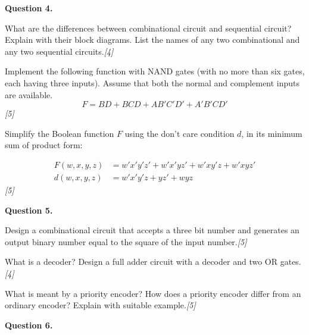 \documentclass[11pt,a4paper]{article}
\newcommand{\pts}[1]{\hfill   \textit{[#1]}}
\begin{document}



\noindent   \textbf{Question 4.}

\begin{parts}
  \item What are the differences between combinational circuit and sequential circuit? Explain with their block diagrams. List the names of any two combinational and any two sequential circuits.\pts{4}
  \item Implement the following function with NAND gates (with no more than six gates, each having three inputs). Assume that both the normal and complement inputs are available.
  \[ F = BD + BCD + AB'C'D' + A'B'CD' \]\pts{5}
  \item Simplify the Boolean function $F$ using the don't care condition $d$, in its minimum sum of product form:
  
\begin{align*}
    F(w, x, y, z) &= w'x'y'z' + w'x'yz' + w'xy'z + w'xyz' \\
    d(w, x, y, z) &= w'x'y'z + yz' + wyz
  \end{align*}\pts{5}
\end{parts}

\bigskip




\noindent   \textbf{Question 5.}

\begin{parts}
  \item Design a combinational circuit that accepts a three bit number and generates an output binary number equal to the square of the input number.\pts{5}
  \item What is a decoder? Design a full adder circuit with a decoder and two OR gates.\pts{4}
  \item What is meant by a priority encoder? How does a priority encoder differ from an ordinary encoder? Explain with suitable example.\pts{5}
\end{parts}

\bigskip




\noindent   \textbf{Question 6.}
\end{document}
